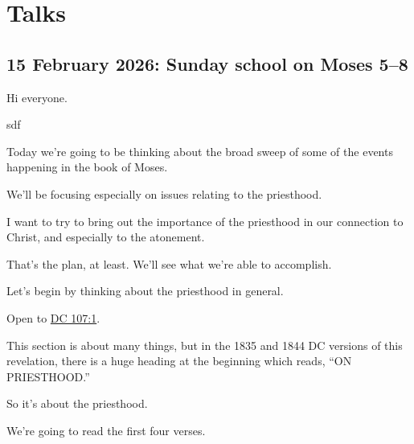 \section{Talks}
	\label{TALKS}
	
	\subsection{15 February 2026: Sunday school on Moses 5--8}
		\label{TALKS-15-02-2026}
		
		\begin{compactitem}
		
			\item Hi everyone.
				\begin{compactitem}
					\item sdf
				\end{compactitem}
				
			\item Today we're going to be thinking about the broad sweep of some of the events happening in the book of Moses.
				\begin{compactitem}
					\item We'll be focusing especially on issues relating to the priesthood.
					\item I want to try to bring out the importance of the priesthood in our connection to Christ, and especially to the atonement.
					\item That's the plan, at least. We'll see what we're able to accomplish.
				\end{compactitem}
				
			\item Let's begin by thinking about the priesthood in general.
				\begin{compactitem}
					\item Open to \hyperref[DC107-1]{DC 107:1}.
					\item This section is about many things, but in the 1835 and 1844 DC versions of this revelation, there is a huge heading at the beginning which reads, ``ON PRIESTHOOD.''
					\item So it's about the priesthood.
					\item We're going to read the first four verses.
				\end{compactitem}
				
				

\end{compactitem}
